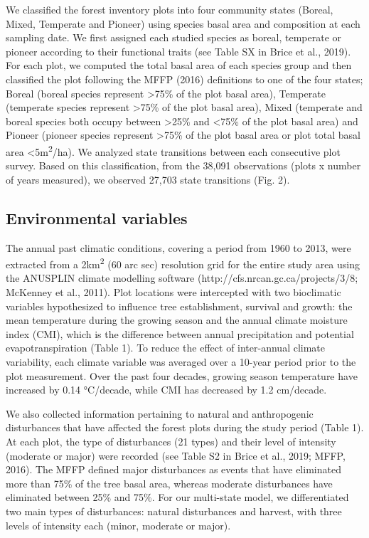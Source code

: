 \documentclass[a4paperpaper,]{article}
\begin{document}
We classified the forest inventory plots into four community states
(Boreal, Mixed, Temperate and Pioneer) using species basal area and
composition at each sampling date. We first assigned each studied
species as boreal, temperate or pioneer according to their functional
traits (see Table SX in Brice et al., 2019). For each plot, we computed
the total basal area of each species group and then classified the plot
following the MFFP (2016) definitions to one of the four states; Boreal
(boreal species represent \textgreater{}75\% of the plot basal area),
Temperate (temperate species represent \textgreater{}75\% of the plot
basal area), Mixed (temperate and boreal species both occupy between
\textgreater{}25\% and \textless{}75\% of the plot basal area) and
Pioneer (pioneer species represent \textgreater{}75\% of the plot basal
area or plot total basal area \textless{}5m\textsuperscript{2}/ha). We
analyzed state transitions between each consecutive plot survey. Based
on this classification, from the 38,091 observations (plots x number of
years measured), we observed 27,703 state transitions (Fig. 2).

\hypertarget{environmental-variables}{%
\subsection{Environmental variables}\label{environmental-variables}}

The annual past climatic conditions, covering a period from 1960 to
2013, were extracted from a 2km\textsuperscript{2} (60 arc sec)
resolution grid for the entire study area using the ANUSPLIN climate
modelling software (http://cfs.nrcan.gc.ca/projects/3/8; McKenney et
al., 2011). Plot locations were intercepted with two bioclimatic
variables hypothesized to influence tree establishment, survival and
growth: the mean temperature during the growing season and the annual
climate moisture index (CMI), which is the difference between annual
precipitation and potential evapotranspiration (Table 1). To reduce the
effect of inter-annual climate variability, each climate variable was
averaged over a 10-year period prior to the plot measurement. Over the
past four decades, growing season temperature have increased by 0.14
°C/decade, while CMI has decreased by 1.2 cm/decade.

We also collected information pertaining to natural and anthropogenic
disturbances that have affected the forest plots during the study period
(Table 1). At each plot, the type of disturbances (21 types) and their
level of intensity (moderate or major) were recorded (see Table S2 in
Brice et al., 2019; MFFP, 2016). The MFFP defined major disturbances as
events that have eliminated more than 75\% of the tree basal area,
whereas moderate disturbances have eliminated between 25\% and 75\%. For
our multi-state model, we differentiated two main types of disturbances:
natural disturbances and harvest, with three levels of intensity each
(minor, moderate or major).
\end{document}
